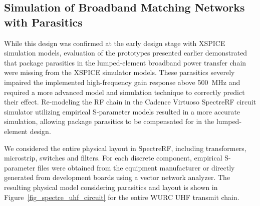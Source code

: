 \subsection{Simulation of Broadband Matching Networks with Parasitics}
\label{sec_wurc_parasitics}

	While this design was confirmed at the early design stage with XSPICE simulation models, evaluation of the prototypes presented earlier demonstrated that package parasitics in the lumped-element broadband power transfer chain were missing from the XSPICE simulator models.
	These parasitics severely impaired the implemented high-frequency gain response above 500~MHz and required a more advanced model and simulation technique to correctly predict their effect.
	Re-modeling the RF chain in the Cadence Virtuoso SpectreRF circuit simulator utilizing empirical S-parameter models resulted in a more accurate simulation, allowing package parasitics to be compensated for in the lumped-element design.

	We considered the entire physical layout in SpectreRF, including transformers, microstrip, switches and filters.
	For each discrete component, empirical S-parameter files were obtained from the equipment manufacturer or directly generated from development boards using a vector network analyzer.
	The resulting physical model considering parasitics and layout is shown in Figure~\ref{fig_spectre_uhf_circuit} for the entire \ac{WURC} UHF transmit chain.
	
